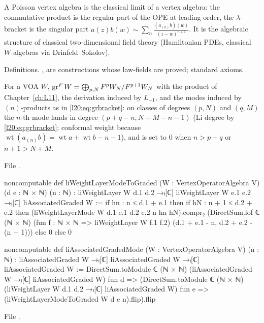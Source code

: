 \begin{physics}
A Poisson vertex algebra is the classical limit of a vertex algebra: the commutative product is the regular
part of the OPE at leading order, the $\lambda$-bracket is the singular part
$a(z)b(w)\sim\sum_n\frac{(a_{(n)}b)(w)}{(z-w)^{n+1}}$. It is the algebraic structure of classical
two-dimensional field theory (Hamiltonian PDEs, classical $W$-algebras via Drinfeld--Sokolov).
\end{physics}

\begin{status}
Definitions. ,  are constructions whose law-fields are proved;
standard axioms.
\end{status}

\begin{definition}\label{l20:def:lipva}
For a VOA $W$, $\operatorname{gr}^F W=\bigoplus_{p,N}F^pW_N/F^{p+1}W_N$ with the product of Chapter~\ref{ch:L11}, the
derivation induced by $L_{-1}$, and the modes induced by $(n)$-products as in \eqref{l20:eq:grbracket}:
on classes of degrees $(p,N)$ and $(q,M)$ the $n$-th mode lands in degree $(p+q-n,N+M-n-1)$ (Li degree by \eqref{l20:eq:grbracket}; conformal weight because
$\operatorname{wt}(a_{(n)}b)=\operatorname{wt}a+\operatorname{wt}b-n-1$), and is set to $0$
when $n>p+q$ or $n+1>N+M$.
\end{definition}
\noindent File .
\begin{leancode}
noncomputable def liWeightLayerModeToGraded (W : VertexOperatorAlgebra V)
    (d e : ℕ × ℕ) (n : ℕ) :
    liWeightLayer W d.1 d.2 →ₗ[ℂ]
      liWeightLayer W e.1 e.2 →ₗ[ℂ] liAssociatedGraded W :=
  if hn : n ≤ d.1 + e.1 then
    if hN : n + 1 ≤ d.2 + e.2 then
      (liWeightLayerMode W d.1 e.1 d.2 e.2 n hn hN).compr₂
        (DirectSum.lof ℂ (ℕ × ℕ)
          (fun f : ℕ × ℕ => liWeightLayer W f.1 f.2)
          (d.1 + e.1 - n, d.2 + e.2 - (n + 1)))
    else 0
  else 0

noncomputable def liAssociatedGradedMode (W : VertexOperatorAlgebra V) (n : ℕ) :
    liAssociatedGraded W →ₗ[ℂ] liAssociatedGraded W →ₗ[ℂ] liAssociatedGraded W :=
  DirectSum.toModule ℂ (ℕ × ℕ) (liAssociatedGraded W →ₗ[ℂ] liAssociatedGraded W)
    fun d => (DirectSum.toModule ℂ (ℕ × ℕ)
      (liWeightLayer W d.1 d.2 →ₗ[ℂ] liAssociatedGraded W)
      fun e => (liWeightLayerModeToGraded W d e n).flip).flip
\end{leancode}
\noindent File .
